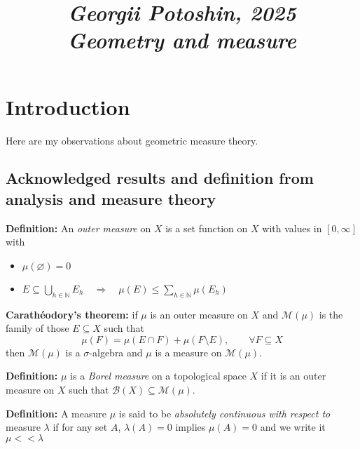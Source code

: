 \documentclass{article}
\begin{document}
\title{
\textit{\small{Georgii Potoshin, 2025}}\\
\vspace{0.3ex}
\textit{\huge{Geometry and measure}}\vspace{1ex}
}
\date{\vspace{-5ex}}
\maketitle


\date{\vspace{-10ex}}

\maketitle

\section{Introduction}
Here are my observations about geometric measure theory.

\subsection{Acknowledged results and definition from analysis and measure theory}
\textbf{Definition:} An \emph{outer measure} on $X$ is a set function on $X$ with
values in $[0,\infty]$ with
\begin{itemize}
    \item $\mu(\varnothing)=0$
    \item $E\subseteq\bigcup_{h\in\mathbb{N}}E_h\quad\Rightarrow\quad\mu(E)\leq\sum_{h\in\mathbb{N}}\mu(E_h)$
\end{itemize}

\vspace{2ex}
\textbf{Carathéodory's theorem:} if $\mu$ is an outer measure on $X$ and $\mathcal
M(\mu)$ is the family of those $E\subseteq X$ such that
\[\mu(F)=\mu(E\cap F)+\mu(F\setminus E),\quad\quad\forall F\subseteq X\]
then $\mathcal M(\mu)$ is a $\sigma$-algebra and $\mu$ is a measure on $\mathcal
M(\mu)$.

\vspace{2ex}
\textbf{Definition:} $\mu$ is a \emph{Borel measure} on a topological space $X$
if it is an outer measure on $X$ such that $\mathcal B(X)\subseteq\mathcal M(\mu)$.

\vspace{2ex}
\textbf{Definition:} A measure $\mu$ is said to be \emph{absolutely continuous
with respect to} measure $\lambda$ if for any set $A$, $\lambda(A)=0$
implies $\mu(A)=0$ and we write it $\mu << \lambda$
\end{document}
